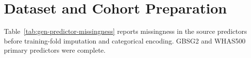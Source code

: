 \chapter{Dataset and Cohort Preparation}\label{appendix-a-dataset-and-cohort-preparation}\label{app:cohorts}

Table~\ref{tab:gen-predictor-missingness} reports missingness in the source predictors before training-fold imputation and categorical encoding. GBSG2 and WHAS500 primary predictors were complete.


